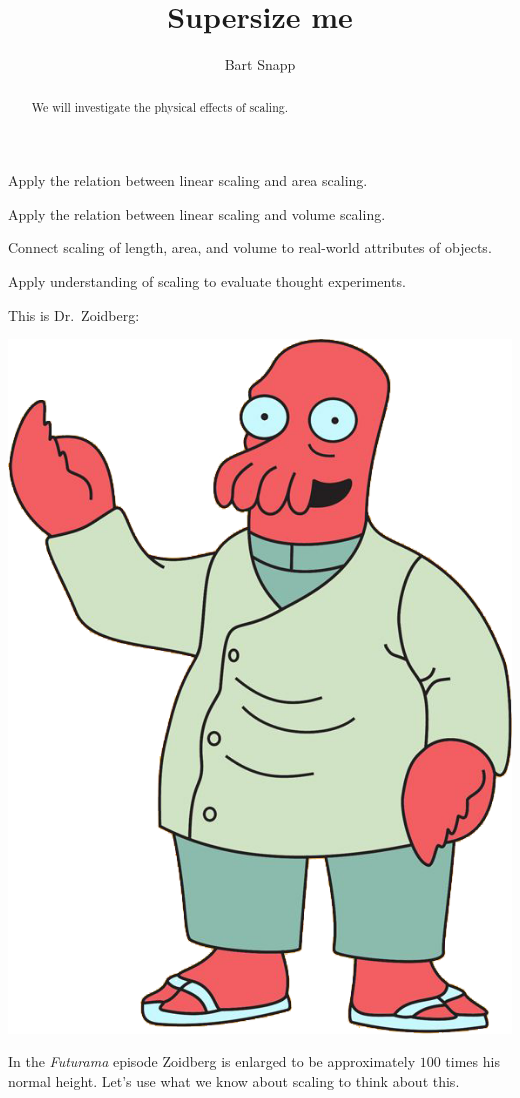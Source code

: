 \documentclass[handout,nooutcomes,noauthor]{ximera}
\title{Supersize me}
\author{Bart Snapp}
\begin{document}
\begin{abstract}
  We will investigate the physical effects of scaling.
\end{abstract}
\maketitle


\begin{listOutcomes}
\item Apply the relation between linear scaling and area scaling.
\item Apply the relation between linear scaling and volume scaling.
\item Connect scaling of length, area, and volume to real-world
  attributes of objects.  
\item Apply understanding of scaling to evaluate thought experiments.
\end{listOutcomes}

This is Dr.\ Zoidberg:

\begin{center}
  \includegraphics[width=.3\textwidth]{zoidberg.png}
\end{center}

In the \textit{Futurama} episode  Zoidberg is enlarged to be
approximately $100$ times his normal height. Let's use what we know
about scaling to think about this.

\mynewpage
\end{document}
